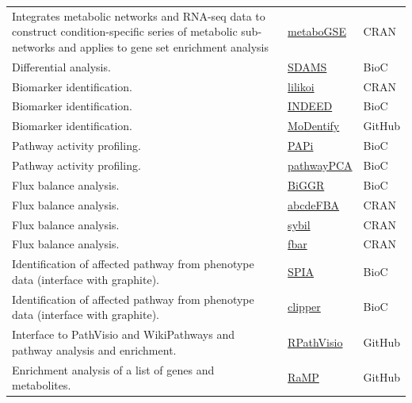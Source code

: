 \documentclass[]{article}
\begin{document}
\begin{longtable}[t]{>{\raggedright\arraybackslash}p{30em}>{\raggedright\arraybackslash}p{10em}>{\raggedright\arraybackslash}p{3em}}
\rowcolor{gray!6}  Integrates metabolic networks and RNA-seq data to construct condition-specific series of metabolic sub-networks and applies to gene set enrichment analysis & \href{https://cran.r-project.org/package=metaboGSE}{metaboGSE} & CRAN\\
Differential analysis. & \href{https://bioconductor.org/packages/release/bioc/html/SDAMS.html}{SDAMS} & BioC\\
\rowcolor{gray!6}  Biomarker identification. & \href{https://cran.r-project.org/package=lilikoi}{lilikoi} & CRAN\\
Biomarker identification. & \href{https://bioconductor.org/packages/release/bioc/html/INDEED.html}{INDEED} & BioC\\
\rowcolor{gray!6}  Biomarker identification. & \href{https://github.com/krumsieklab/MoDentify}{MoDentify} & GitHub\\
Pathway activity profiling. & \href{https://doi.org/doi:10.18129/B9.bioc.PAPi}{PAPi} & BioC\\
\rowcolor{gray!6}  Pathway activity profiling. & \href{https://www.bioconductor.org/packages/devel/bioc/html/pathwayPCA.html}{pathwayPCA} & BioC\\
Flux balance analysis. & \href{https://bioconductor.org/packages/release/bioc/html/BiGGR.html}{BiGGR} & BioC\\
\rowcolor{gray!6}  Flux balance analysis. & \href{https://cran.r-project.org/package=abcdeFBA}{abcdeFBA} & CRAN\\
Flux balance analysis. & \href{https://cran.r-project.org/package=sybil}{sybil} & CRAN\\
\rowcolor{gray!6}  Flux balance analysis. & \href{https://cran.r-project.org/package=fbar}{fbar} & CRAN\\
Identification of affected pathway from phenotype data (interface with graphite). & \href{https://www.bioconductor.org/packages/release/bioc/html/SPIA.html}{SPIA} & BioC\\
\rowcolor{gray!6}  Identification of affected pathway from phenotype data (interface with graphite). & \href{https://www.bioconductor.org/packages/release/bioc/html/clipper.html}{clipper} & BioC\\
Interface to PathVisio and WikiPathways and pathway analysis and enrichment. & \href{https://github.com/PathVisio/RpathVisio}{RPathVisio} & GitHub\\
\rowcolor{gray!6}  Enrichment analysis of a list of genes and metabolites. & \href{https://github.com/Mathelab/RaMP-DB}{RaMP} & GitHub\\

\end{longtable}
\end{document}
